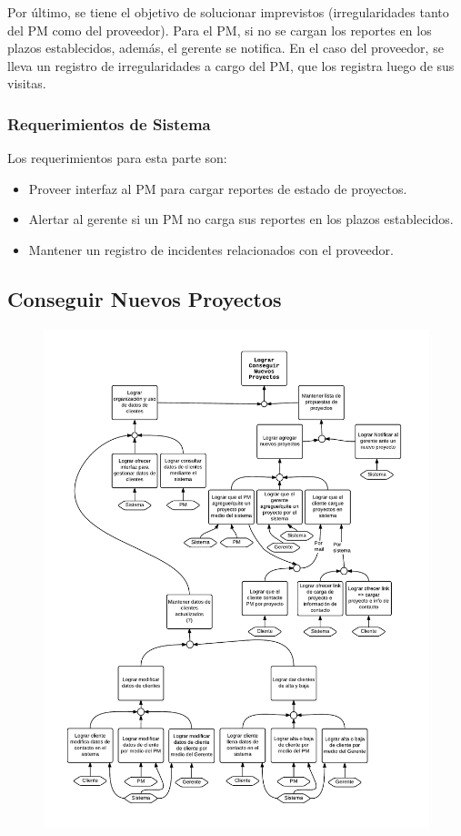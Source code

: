 Por último, se tiene el objetivo de solucionar imprevistos (irregularidades tanto del PM como del proveedor).
Para el PM, si no se cargan los reportes en los plazos establecidos, además, el gerente se notifica. En el caso del proveedor, se lleva un registro de irregularidades a cargo del PM, que los registra luego de sus visitas.

\subsubsection{Requerimientos de Sistema}
Los requerimientos para esta parte son:
\begin{itemize}
	\item Proveer interfaz al PM para cargar reportes de estado de proyectos.
	\item Alertar al gerente si un PM no carga sus reportes en los plazos establecidos.
	\item Mantener un registro de incidentes relacionados con el proveedor.
\end{itemize}

\subsection{Conseguir Nuevos Proyectos}
\begin{figure}[H]
\includegraphics[width=\textwidth, clip=true, trim=15pt 20pt 15pt 20pt]{imagenes/objetivos/objetivos15.pdf}
\end{figure}

